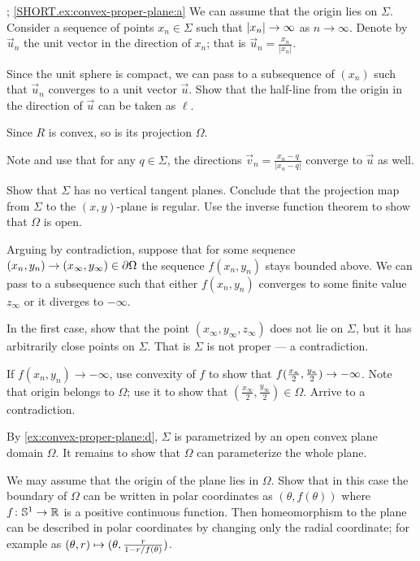 \parbf{\ref{ex:convex-proper-plane}}; \ref{SHORT.ex:convex-proper-plane:a}
We can assume that the origin lies on $\Sigma$.
Consider a sequence of points $x_n\in \Sigma$ such that $|x_n|\z\to \infty$ as $n\to \infty$.
Denote by $\vec u_n$ the unit vector in the direction of $x_n$; that is $\vec u_n=\tfrac{x_n}{|x_n|}$.

Since the unit sphere is compact, we can pass to a subsequence of $(x_n)$ such that $\vec u_n$ converges to a unit vector $\vec u$.
Show that the half-line from the origin in the direction of $\vec u$ can be taken as $\ell$.


Since $R$ is convex, so is its projection $\Omega$.

Note and use that for any $q\in \Sigma$, the directions $\vec v_n=\tfrac{x_n-q}{|x_n-q|}$ converge to $\vec u$ as well.

Show that $\Sigma$ has no vertical tangent planes.
Conclude that the projection map from $\Sigma$ to the $(x,y)$-plane is regular.
Use the inverse function theorem to show that $\Omega$ is open.

Arguing by contradiction, suppose that for some sequence $(x_n,y_n)\z\to(x_\infty,y_\infty)\in \partial\Omega$ the sequence $f(x_n,y_n)$ stays bounded above.
We can pass to a subsequence such that either $f(x_n,y_n)$ converges to some finite value $z_\infty$ or it diverges to $-\infty$.

In the first case, show that the point $(x_\infty, y_\infty,z_\infty)$ does not lie on $\Sigma$, but it has arbitrarily close points on $\Sigma$.
That is $\Sigma$ is not proper --- a contradiction.

If $f(x_n,y_n)\to -\infty$, use convexity of $f$ to show that $f(\tfrac{x_n}2 ,\tfrac{y_n}2)\z\to -\infty$.
Note that origin belongs to $\Omega$;
use it to show that $(\tfrac{x_\infty}2, \tfrac{y_\infty}2)\in\Omega$.
Arrive to a contradiction.

By \ref{ex:convex-proper-plane:d}, $\Sigma$ is parametrized by an open convex plane domain $\Omega$.
It remains to show that $\Omega$ can parameterize the whole plane.

We may assume that the origin of the plane lies in $\Omega$.
Show that in this case the boundary of $\Omega$ can be written in polar coordinates as $(\theta,f(\theta))$ where $f\colon\mathbb{S}^1\to\mathbb{R}$ is a positive continuous function.
Then homeomorphism to the plane can be described in polar coordinates by changing only the radial coordinate;
for example as 
$(\theta,r)\z\mapsto (\theta,
\tfrac{r}{1-r/f(\theta)})$.

